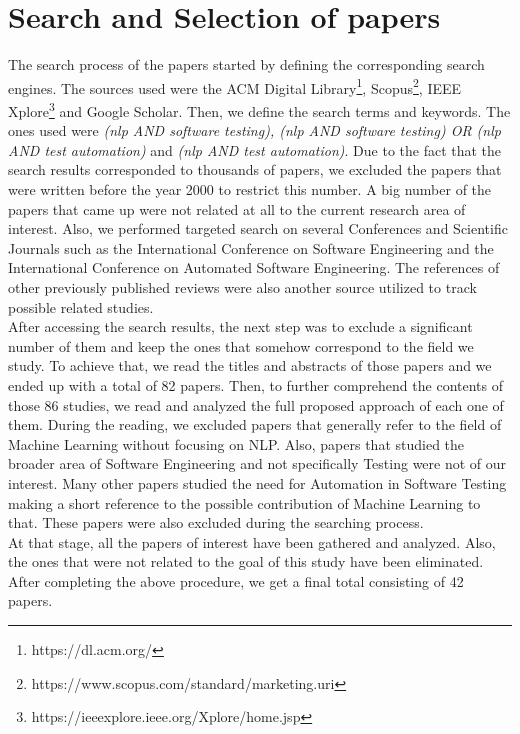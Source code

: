 \section {Search and Selection of papers}
The search process of the papers started by defining the corresponding search engines. The sources used were the ACM Digital Library\footnote{https://dl.acm.org/}, Scopus\footnote{https://www.scopus.com/standard/marketing.uri}, 
IEEE Xplore\footnote{https://ieeexplore.ieee.org/Xplore/home.jsp} and Google Scholar. Then, we define the search terms and keywords. The ones used were \emph{(nlp AND software testing), (nlp 
AND software testing) OR (nlp AND test automation)} and \emph{(nlp AND test automation)}. Due to the fact that the search results corresponded 
to thousands of papers, we excluded the papers that were written before the year 2000 to restrict this number. A big number of the papers that came up 
were not related at all to the current research area of interest. Also, we performed targeted search on several Conferences and Scientific Journals such 
as the International Conference on Software Engineering and the International Conference on Automated Software Engineering. The references of other previously 
published reviews were also another source utilized to track possible related studies. \\

After accessing the search results, the next step was to exclude a significant number of them and keep the ones that somehow correspond to the field we study. 
To achieve that, we read the titles and abstracts of those papers and we ended up with a total of 82 papers. Then, to further comprehend the contents of those 86 studies, 
we read and analyzed the full proposed approach of each one of them. During the reading, we excluded papers that generally refer to the field of 
Machine Learning without focusing on NLP. Also, papers that studied the broader area of Software Engineering and not specifically Testing were not 
of our interest. Many other papers studied the need for Automation in Software Testing making a short reference to the possible contribution of Machine 
Learning to that. These papers were also excluded during the searching process. \\

At that stage, all the papers of interest have been gathered and analyzed. Also, the ones that were not related to the goal of this study have been 
eliminated. After completing the above procedure, we get a final total consisting of 42 papers. 